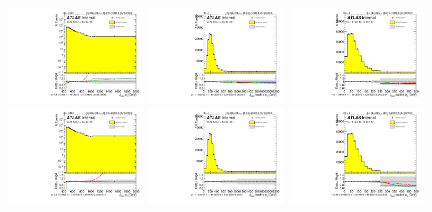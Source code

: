 \begin{figure}[htbp!]
\begin{center}
\includegraphics[angle=270, width=0.32\textwidth]{./figures/boosted/Reweight/Fits/Moriond_bkg_3_NoTag_3Trk_subl_Incl_leadHCand_Pt_m_1.pdf}
\includegraphics[angle=270, width=0.32\textwidth]{./figures/boosted/Reweight/Fits/Moriond_bkg_3_NoTag_3Trk_subl_Incl_leadHCand_trk0_Pt.pdf}
\includegraphics[angle=270, width=0.32\textwidth]{./figures/boosted/Reweight/Fits/Moriond_bkg_3_NoTag_3Trk_subl_Incl_leadHCand_trk1_Pt.pdf} \\
\includegraphics[angle=270, width=0.32\textwidth]{./figures/boosted/Reweight/Fits/Moriond_bkg_9_NoTag_3Trk_subl_Incl_leadHCand_Pt_m_1.pdf}
\includegraphics[angle=270, width=0.32\textwidth]{./figures/boosted/Reweight/Fits/Moriond_bkg_9_NoTag_3Trk_subl_Incl_leadHCand_trk0_Pt.pdf}
\includegraphics[angle=270, width=0.32\textwidth]{./figures/boosted/Reweight/Fits/Moriond_bkg_9_NoTag_3Trk_subl_Incl_leadHCand_trk1_Pt.pdf} \\

\end{center}
\end{figure}
